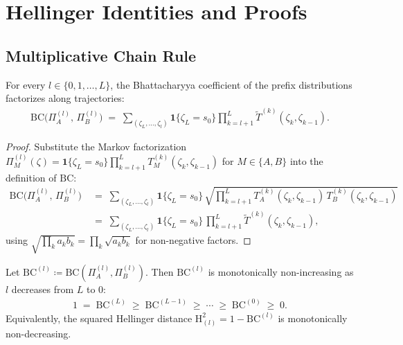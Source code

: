 \section{Hellinger Identities and Proofs}

\subsection{Multiplicative Chain Rule}\label{ptnb:sec:lmp-chain-rule}

\begin{lemmaenv}\label{ptnb:lem:bc-chain-rule}
For every $l \in \{0, 1, \ldots, L\}$, the Bhattacharyya coefficient of the prefix distributions
factorizes along trajectories:
\begin{align}\label{ptnb:eq:bc-chain-rule}
    \mathrm{BC}\!\bigl(\Pi^{(l)}_A,\, \Pi^{(l)}_B\bigr) \;=\; \sum_{(\zeta_L, \ldots, \zeta_l)}
    \mathbf{1}\{\zeta_L = s_0\} \prod_{k=l+1}^{L} \widetilde{T}^{(k)}(\zeta_k, \zeta_{k-1}).
\end{align}\end{lemmaenv}

\begin{proof}
Substitute the Markov factorization $\Pi^{(l)}_M(\zeta) = \mathbf{1}\{\zeta_L =
    s_0\}\prod_{k=l+1}^L T^{(k)}_M(\zeta_k, \zeta_{k-1})$ for $M \in \{A,B\}$ into the definition of
$\mathrm{BC}$:
\begin{align}
    \mathrm{BC}\!\bigl(\Pi^{(l)}_A,\, \Pi^{(l)}_B\bigr)
    &\;=\; \sum_{(\zeta_L, \ldots, \zeta_l)} \mathbf{1}\{\zeta_L = s_0\}\,
    \sqrt{\prod_{k=l+1}^{L} T^{(k)}_A(\zeta_k, \zeta_{k-1})\, T^{(k)}_B(\zeta_k, \zeta_{k-1})} \\
    &\;=\; \sum_{(\zeta_L, \ldots, \zeta_l)} \mathbf{1}\{\zeta_L = s_0\}\,
    \prod_{k=l+1}^{L} \widetilde{T}^{(k)}(\zeta_k, \zeta_{k-1}),
\end{align}
using $\sqrt{\prod_k a_k b_k} = \prod_k \sqrt{a_k b_k}$ for non-negative factors.
\end{proof}

\begin{lemmaenv}\label{ptnb:lem:bc-monotone}
Let $\mathrm{BC}^{(l)} \coloneqq \mathrm{BC}(\Pi^{(l)}_A, \Pi^{(l)}_B)$.  Then $\mathrm{BC}^{(l)}$
is monotonically non-increasing as $l$ decreases from $L$ to $0$:
\begin{align}
    1 \;=\; \mathrm{BC}^{(L)} \;\geq\; \mathrm{BC}^{(L-1)} \;\geq\; \cdots \;\geq\; \mathrm{BC}^{(0)}
    \;\geq\; 0.
\end{align}
Equivalently, the squared Hellinger distance $\mathrm{H}^{2}_{(l)} = 1 - \mathrm{BC}^{(l)}$ is
monotonically non-decreasing.\end{lemmaenv}

